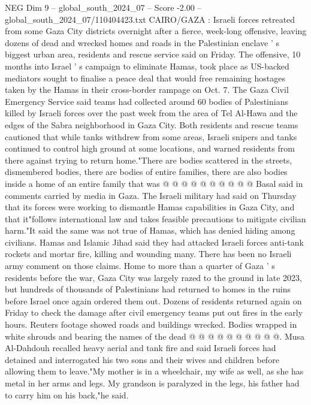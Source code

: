 \begin{textsample}{NEG Dim 9 – global\_south\_2024\_07 – Score -2.00 – global\_south\_2024\_07/110404423.txt}  \label{ex:f9_neg_346}
CAIRO/GAZA : Israeli forces retreated from some Gaza City districts overnight after a fierce, week-long offensive, leaving dozens of dead and wrecked homes and roads in the Palestinian enclave ' s biggest urban area, residents and rescue service said on Friday.
The offensive, 10 months into Israel ' s campaign to eliminate Hamas, took place as US-backed mediators sought to finalise a peace deal that would free remaining hostages taken by the Hamas in their cross-border rampage on Oct. 7.
The Gaza Civil Emergency Service said teams had collected around 60 bodies of Palestinians killed by Israeli forces over the past week from the area of Tel Al-Hawa and the edges of the Sabra neighborhood in Gaza City.
Both residents and rescue teams cautioned that while tanks withdrew from some areas, Israeli snipers and tanks continued to control high ground at some locations, and warned residents from there against trying to return home."There are bodies scattered in the streets, dismembered bodies, there are bodies of entire families, there are also bodies inside a home of an entire family that was @ @ @ @ @ @ @ @ @ @ Basal said in comments carried by media in Gaza.
The Israeli military had said on Thursday that its forces were working to dismantle Hamas capabilities in Gaza City, and that it"follows international law and takes feasible precautions to mitigate civilian harm."It said the same was not true of Hamas, which has denied hiding among civilians.
Hamas and Islamic Jihad said they had attacked Israeli forces anti-tank rockets and mortar fire, killing and wounding many.
There has been no Israeli army comment on those claims.
Home to more than a quarter of Gaza ' s residents before the war, Gaza City was largely razed to the ground in late 2023, but hundreds of thousands of Palestinians had returned to homes in the ruins before Israel once again ordered them out.
Dozens of residents returned again on Friday to check the damage after civil emergency teams put out fires in the early hours.
Reuters footage showed roads and buildings wrecked.
Bodies wrapped in white shrouds and bearing the names of the dead @ @ @ @ @ @ @ @ @ @.
Musa Al-Dahdouh recalled heavy aerial and tank fire and said Israeli forces had detained and interrogated his two sons and their wives and children before allowing them to leave."My mother is in a wheelchair, my wife as well, as she has metal in her arms and legs.
My grandson is paralyzed in the legs, his father had to carry him on his back,"he said.

\end{textsample}
